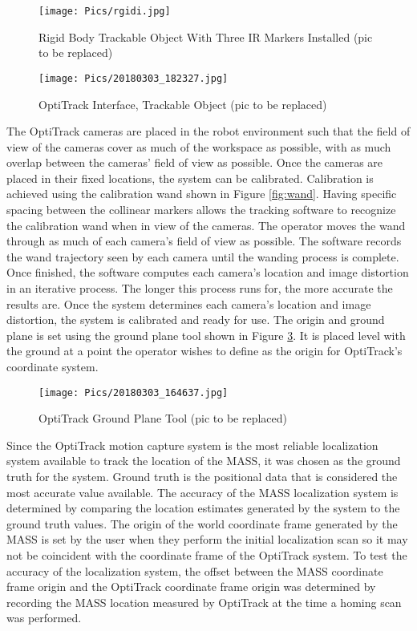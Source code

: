 \begin{figure}
    \centering
    \texttt{[image: Pics/rgidi.jpg]}
    \caption{Rigid Body Trackable Object With Three IR Markers Installed (pic to be replaced)}
    \label{fig:trackable}
\end{figure}
\begin{figure}
    \centering
    \texttt{[image: Pics/20180303\_182327.jpg]}
    \caption{OptiTrack Interface, Trackable Object (pic to be replaced)}
    \label{fig:motivetrackable}
\end{figure}

The OptiTrack cameras are placed in the robot environment such that the field of view of the cameras cover as much of the workspace as possible, with as much overlap between the cameras' field of view as possible. Once the cameras are placed in their fixed locations, the system can be calibrated. Calibration is achieved using the calibration wand shown in Figure \ref{fig:wand}. Having specific spacing between the collinear markers allows the tracking software to recognize the calibration wand when in view of the cameras. The operator moves the wand through as much of each camera's field of view as possible. The software records the wand trajectory seen by each camera until the wanding process is complete. Once finished, the software computes each camera's location and image distortion in an iterative process. The longer this process runs for, the more accurate the results are. Once the system determines each camera's location and image distortion, the system is calibrated and ready for use. The origin and ground plane is set using the ground plane tool shown in Figure \ref{fig:groundplane}. It is placed level with the ground at a point the operator wishes to define as the origin for OptiTrack's coordinate system.\\

\begin{figure}
    \centering
    \texttt{[image: Pics/20180303\_164637.jpg]}
    \caption{OptiTrack Ground Plane Tool (pic to be replaced)}
    \label{fig:groundplane}
\end{figure}

Since the OptiTrack motion capture system is the most reliable localization system available to track the location of the MASS, it was chosen as the ground truth for the system. Ground truth is the positional data that is considered the most accurate value available. The accuracy of the MASS localization system is determined by comparing the location estimates generated by the system to the ground truth values. The origin of the world coordinate frame generated by the MASS is set by the user when they perform the initial localization scan so it may not be coincident with the coordinate frame of the OptiTrack system. To test the accuracy of the localization system, the offset between the MASS coordinate frame origin and the OptiTrack coordinate frame origin was determined by recording the MASS location measured by OptiTrack at the time a homing scan was performed.\\

